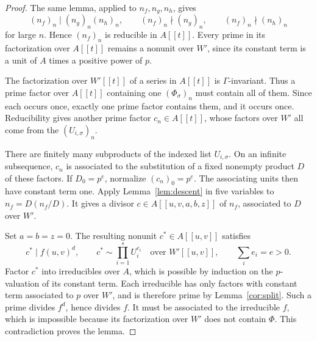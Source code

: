 \documentclass[11pt]{amsart}
\theoremstyle{remark}
\begin{document}
\begin{proof}
The same lemma, applied to $n_f,n_g,n_h$, gives
\[
 (n_f)_n\mid(n_g)_n(n_h)_n,\qquad
 (n_f)_n\nmid(n_g)_n,\qquad (n_f)_n\nmid(n_h)_n
\]
for large $n$. Hence $(n_f)_n$ is reducible in $A[[t]]$.
Every prime in its factorization over $A[[t]]$ remains a nonunit
over $W'$, since its constant term is a unit of $A$ times a
positive power of $p$.

The factorization over $W'[[t]]$ of a series in $A[[t]]$ is
$\Gamma$-invariant. Thus a prime factor over $A[[t]]$ containing
one $(\Phi_\sigma)_n$ must contain all of them. Since each occurs
once, exactly one prime factor contains them, and it occurs once.
Reducibility gives another prime factor $c_n\in A[[t]]$, whose
factors over $W'$ all come from the $(U_{i,\sigma})_n$.

There are finitely many subproducts of the indexed list
$U_{i,\sigma}$. On an infinite subsequence, $c_n$ is associated
to the substitution of a fixed nonempty product $D$ of these
factors. If $D_0=p^e$, normalize $(c_n)_0=p^e$. The associating
units then have constant term one. Apply Lemma~\ref{lem:descent}
in five variables to $n_f=D(n_f/D)$. It gives a divisor
$c\in A[[u,v,a,b,z]]$ of $n_f$, associated to $D$ over $W'$.

Set $a=b=z=0$. The resulting nonunit $c^*\in A[[u,v]]$ satisfies
\[
 c^*\mid f(u,v)^d,\qquad
 c^*\sim\prod_{i=1}^s U_i^{e_i}\quad\text{over }W'[[u,v]],
 \qquad\sum_i e_i=e>0.
\]
Factor $c^*$ into irreducibles over $A$, which is possible by
induction on the $p$-valuation of its constant term. Each irreducible
has only factors with constant term associated to $p$ over $W'$,
and is therefore prime by Lemma~\ref{cor:split}. Such a prime
divides $f^d$, hence divides $f$. It must be associated to the
irreducible $f$, which is impossible because its factorization over
$W'$ does not contain $\Phi$. This contradiction proves the lemma.
\end{proof}
\end{document}
